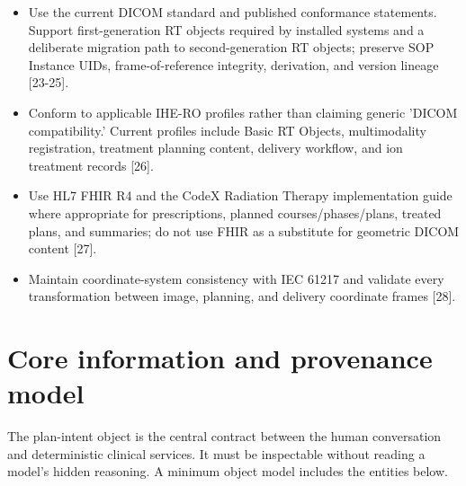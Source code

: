 \documentclass[11pt,letterpaper]{article}
\begin{document}
\begin{itemize}
\item Use the current DICOM standard and published conformance statements. Support first-generation RT objects required by installed systems and a deliberate migration path to second-generation RT objects; preserve SOP Instance UIDs, frame-of-reference integrity, derivation, and version lineage [23-25].
\item Conform to applicable IHE-RO profiles rather than claiming generic 'DICOM compatibility.' Current profiles include Basic RT Objects, multimodality registration, treatment planning content, delivery workflow, and ion treatment records [26].
\item Use HL7 FHIR R4 and the CodeX Radiation Therapy implementation guide where appropriate for prescriptions, planned courses\slash\allowbreak{}phases\slash\allowbreak{}plans, treated plans, and summaries; do not use FHIR as a substitute for geometric DICOM content [27].
\item Maintain coordinate-system consistency with IEC 61217 and validate every transformation between image, planning, and delivery coordinate frames [28].
\end{itemize}

\section{Core information and provenance model}

The plan-intent object is the central contract between the human conversation and deterministic clinical services. It must be inspectable without reading a model's hidden reasoning. A minimum object model includes the entities below.
\end{document}
